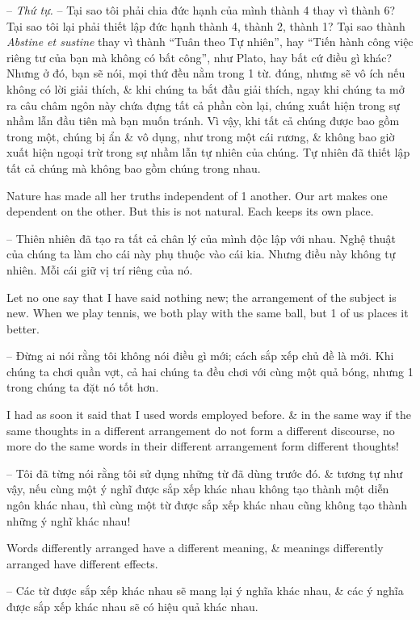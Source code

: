 \documentclass{article}
\begin{document}
\begin{enumerate}
\begin{itemize}
		-- {\it Thứ tự.} -- Tại sao tôi phải chia đức hạnh của mình thành 4 thay vì thành 6? Tại sao tôi lại phải thiết lập đức hạnh thành 4, thành 2, thành 1? Tại sao thành {\it Abstine et sustine} thay vì thành ``Tuân theo Tự nhiên'', hay ``Tiến hành công việc riêng tư của bạn mà không có bất công'', như {\sc Plato}, hay bất cứ điều gì khác? Nhưng ở đó, bạn sẽ nói, mọi thứ đều nằm trong 1 từ. đúng, nhưng sẽ vô ích nếu không có lời giải thích, \& khi chúng ta bắt đầu giải thích, ngay khi chúng ta mở ra câu châm ngôn này chứa đựng tất cả phần còn lại, chúng xuất hiện trong sự nhầm lẫn đầu tiên mà bạn muốn tránh. Vì vậy, khi tất cả chúng được bao gồm trong một, chúng bị ẩn \& vô dụng, như trong một cái rương, \& không bao giờ xuất hiện ngoại trừ trong sự nhầm lẫn tự nhiên của chúng. Tự nhiên đã thiết lập tất cả chúng mà không bao gồm chúng trong nhau.
		
		 Nature has made all her truths independent of 1 another. Our art makes one dependent on the other. But this is not natural. Each keeps its own place.
		
		-- Thiên nhiên đã tạo ra tất cả chân lý của mình độc lập với nhau. Nghệ thuật của chúng ta làm cho cái này phụ thuộc vào cái kia. Nhưng điều này không tự nhiên. Mỗi cái giữ vị trí riêng của nó.
		
		 Let no one say that I have said nothing new; the arrangement of the subject is new. When we play tennis, we both play with the same ball, but 1 of us places it better.
		
		-- Đừng ai nói rằng tôi không nói điều gì mới; cách sắp xếp chủ đề là mới. Khi chúng ta chơi quần vợt, cả hai chúng ta đều chơi với cùng một quả bóng, nhưng 1 trong chúng ta đặt nó tốt hơn.
		
		I had as soon it said that I used words employed before. \& in the same way if the same thoughts in a different arrangement do not form a different discourse, no more do the same words in their different arrangement form different thoughts!
		
		-- Tôi đã từng nói rằng tôi sử dụng những từ đã dùng trước đó. \& tương tự như vậy, nếu cùng một ý nghĩ được sắp xếp khác nhau không tạo thành một diễn ngôn khác nhau, thì cùng một từ được sắp xếp khác nhau cũng không tạo thành những ý nghĩ khác nhau!		
		
		 Words differently arranged have a different meaning, \& meanings differently arranged have different effects.
		
		-- Các từ được sắp xếp khác nhau sẽ mang lại ý nghĩa khác nhau, \& các ý nghĩa được sắp xếp khác nhau sẽ có hiệu quả khác nhau.
		

\end{itemize}
\end{enumerate}
\end{document}
